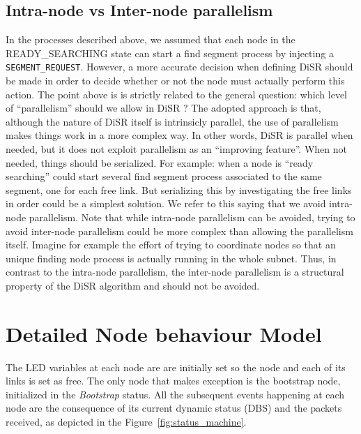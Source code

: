 \subsection{Intra-node vs Inter-node parallelism}
In the processes described above, we assumed that each node in the
READY\_SEARCHING state can start a find segment process by injecting a
\texttt{SEGMENT\_REQUEST}. However, a more accurate decision when defining DiSR
should be made in order to decide whether or not the node must
actually perform this action. 
The point above is is strictly related to the general question: which
level of “parallelism” should we allow in DiSR ? The adopted approach
is that, although the nature of DiSR itself is intrinsicly parallel,
the use of parallelism makes things work in a more complex way. In
other words, DiSR is parallel when needed, but it does not exploit
parallelism as an “improving feature”. When not needed, things should
be serialized. For example: when a node is “ready searching” could
start several find segment process associated to the same segment, one
for each free link. But serializing this by investigating the free
links in order could be a simplest solution. We refer to this saying
that we avoid intra-node parallelism.  Note that while intra-node
parallelism can be avoided, trying to avoid inter-node parallelism
could be more complex than allowing the parallelism itself. Imagine
for example the effort of trying to coordinate nodes so that an unique
finding node process is actually running in the whole subnet. Thus, in
contrast to the intra-node parallelism, the inter-node parallelism is
a structural property of the DiSR algorithm and should not be avoided.

\section{Detailed Node behaviour Model}

The LED variables at each node are are initially set so the node and
each of its links is set as free. The only node that makes exception
is the bootstrap node, initialized in the \emph{Bootstrap} status. All
the subsequent events happening at each node are the consequence of
its current dynamic status (DBS) and the packets received, as depicted
in the Figure~\ref{fig:status_machine}.

\label{sec:disr_detailed_model}


